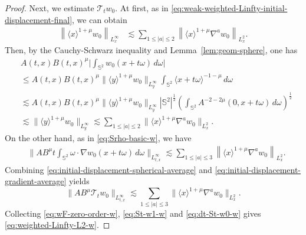 \documentclass[11pt,twoside]{article}
\def\f{\frac}
\def\ls{\lesssim}
\newcommand{\Sph}{\mathbb{S}^2}
\theoremstyle{plain}
\theoremstyle{definition}
\theoremstyle{assumption}
\numberwithin{equation}{section}
\begin{document}
\begin{proof}
		Next, we estimate $\mathcal{T}_t w_0$.
		At first, as in \eqref{eq:weak-weighted-Linfty-initial-displacement-final}, we can obtain
		\begin{equation}\label{eq:weighted-Linfty-initial-displacement}
			\begin{aligned}
				\left\|
				\langle x\rangle^{1+\mu}w_0
				\right\|_{L^\infty_x}
				&\ls
				\sum_{1\le|a|\le2}
				\left\|
				\langle x\rangle^{1+\mu}
				\nabla^a w_0
				\right\|_{L^2_x}.
			\end{aligned}
		\end{equation}
		Then, by the Cauchy-Schwarz inequality and Lemma~\ref{lem:geom-sphere}, one has
		\begin{equation}\label{eq:initial-displacement-spherical-average}
			\begin{aligned}
				&
				A(t,x)B(t,x)^\mu
				\big|
				\int_{\mathbb S^2}
				w_0(x+t\omega)\,d\omega
				\big|\\
				&\le
				A(t,x)B(t,x)^\mu
				\big\|
				\langle y\rangle^{1+\mu}w_0
				\big\|_{L^\infty_y}
				\int_{\mathbb S^2}
				\langle x+t\omega\rangle^{-1-\mu}\,d\omega
				\\
				&\ls
				A(t,x)B(t,x)^\mu
				\big\|
				\langle y\rangle^{1+\mu}w_0
				\big\|_{L^\infty_y}
				|\Sph|^{\f12}
				\left(\int_{\mathbb S^2}
				A^{-2-2\mu}(0,x+t\omega)\,d\omega\right)^{\f12}
				\\
				&\ls
				\big\|
				\langle y\rangle^{1+\mu}w_0
				\big\|_{L^\infty_y}
				\ls
				\sum_{1\le|a|\le2}
				\big\|
				\langle x\rangle^{1+\mu}
				\nabla^a w_0
				\big\|_{L^2_x}.
			\end{aligned}
		\end{equation}
		On the other hand, as in \eqref{eq:Srho-basic-w}, we have
		\begin{equation}\label{eq:initial-displacement-gradient-average}
			\begin{aligned}
				&
				\big\|
				A B^\mu
				t
				\int_{\mathbb S^2}
				\omega\cdot\nabla  w_0(x+t\omega)\,d\omega
				\big\|_{L^\infty_{t,x}}
				\ls
				\sum_{1\le|a|\le3}
				\left\|
				\langle x\rangle^{1+\mu}
				\nabla^a  w_0
				\right\|_{L^2_x}.
			\end{aligned}
		\end{equation}
		Combining \eqref{eq:initial-displacement-spherical-average} and
		\eqref{eq:initial-displacement-gradient-average} yields
		\begin{equation}\label{eq:dt-St-w0-w}
			\|A B^\mu \mathcal{T}_t  w_0\|_{L^\infty_{t,x}}
			\ls
			\sum_{1\le|a|\le3}
			\|\langle x\rangle^{1+\mu}\nabla^a  w_0\|_{L^2_x}.
		\end{equation}
		Collecting \eqref{eq:wF-zero-order-w}, \eqref{eq:St-w1-w} and
		\eqref{eq:dt-St-w0-w} gives \eqref{eq:weighted-Linfty-L2-w}.
		

\end{proof}
\end{document}
